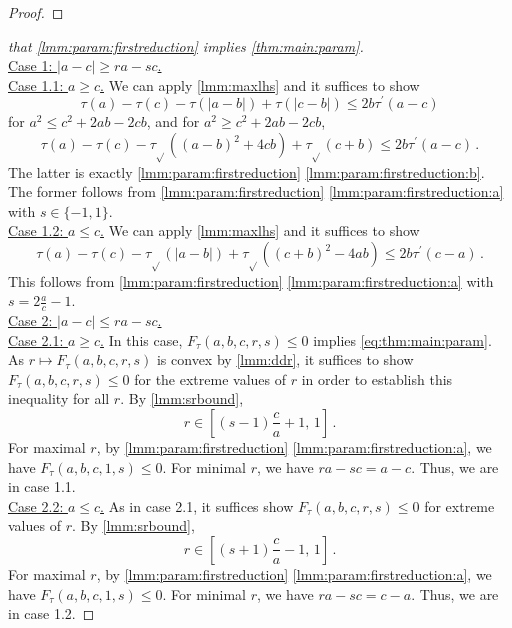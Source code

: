 \documentclass{article}
\newcommand{\lab}{\left[} %
\newcommand{\rab}{\right]} %
\newcommand{\ab}[1]{\lab #1 \rab} %
\newcommand{\abOf}[1]{\!\ab{#1}} %
\newcommand{\abs}[1]{\left| #1 \right|} %
\newcommand{\pr}{^\prime}
\newcommand{\equationFullstop}{\, .}
\newcommand{\eqfs}{\equationFullstop}
\newcommand{\tran}{\tau}
\newcommand{\trans}{\tran_{\!\sqrt{}}}
\newcommand{\dtran}{\tran\pr}
\newcommand{\ifu}{F_{\tran}}
\begin{document}
\begin{appendix}
\begin{proof}
\end{proof}
%
\begin{proof}[that \cref{lmm:param:firstreduction} implies \cref{thm:main:param}]\mbox{ }\\
	\underline{Case 1: $|a-c| \geq ra-sc$.}\\
	\underline{Case 1.1: $a\geq c$.} 
		We can apply \cref{lmm:maxlhs} and it suffices to show 
		\begin{equation}
			\tran(a)-\tran(c)-\tran(|a-b|)+\tran(|c-b|) \leq 2 b \dtran(a - c)
		\end{equation}
		for $a^2 \leq c^2+2ab-2cb$, and for $a^2 \geq c^2+2ab-2cb$,
		\begin{equation}
			\tran(a)-\tran(c)-\trans((a-b)^2+4cb)+\trans(c+b) \leq 2 b \dtran(a - c)
			\eqfs
		\end{equation}
		The latter is exactly \cref{lmm:param:firstreduction} \ref{lmm:param:firstreduction:b}. The former follows from \cref{lmm:param:firstreduction} \ref{lmm:param:firstreduction:a} with $s\in\{-1, 1\}$.
	\\
	\underline{Case 1.2: $a\leq c$.} 
		We can apply \cref{lmm:maxlhs} and it suffices to show 
		\begin{equation}
			\tran(a)-\tran(c)-\trans(\abs{a-b})+\trans((c+b)^2-4ab) \leq 2 b \dtran(c - a)
			\eqfs
		\end{equation}
		This follows from \cref{lmm:param:firstreduction} \ref{lmm:param:firstreduction:a} with $s = 2\frac ac-1$.
	\\
	\underline{Case 2: $|a-c| \leq ra-sc$.}\\
	\underline{Case 2.1: $a\geq c$.} 
		In this case, $\ifu(a,b,c,r,s) \leq 0$ implies \eqref{eq:thm:main:param}.
		As $r\mapsto \ifu(a,b,c,r,s)$ is convex by \cref{lmm:ddr}, it suffices to show $\ifu(a,b,c,r,s) \leq 0$ for the extreme values of $r$ in order to establish this inequality for all $r$.
		By \cref{lmm:srbound}, 
		\begin{equation}
			r\in\abOf{(s-1)\frac ca+1,\, 1}\eqfs
		\end{equation}
		For maximal $r$, by \cref{lmm:param:firstreduction} \ref{lmm:param:firstreduction:a}, we have $\ifu(a,b,c,1,s) \leq 0$.
		For minimal $r$, we have $ra-sc = a-c$. Thus, we are in case 1.1. 
	\\
	\underline{Case 2.2: $a\leq c$.} 
		As in case 2.1, it suffices show $\ifu(a,b,c,r,s) \leq 0$ for extreme values of $r$. By \cref{lmm:srbound}, 
		\begin{equation}
			r\in\abOf{(s+1)\frac ca -1,\, 1}
			\eqfs
		\end{equation}
		For maximal $r$, by \cref{lmm:param:firstreduction} \ref{lmm:param:firstreduction:a}, we have $\ifu(a,b,c,1,s) \leq 0$.
		For minimal $r$, we have $ra-sc = c-a$.  Thus, we are in case 1.2.
\end{proof}
%
%
%

\end{appendix}
\end{document}
